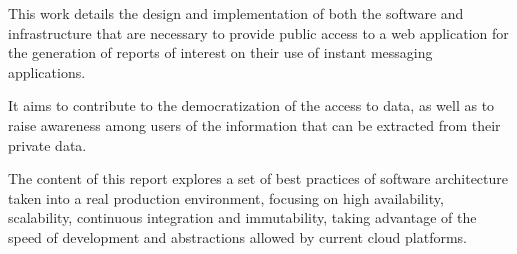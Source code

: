 
This work details the design and implementation of both the software and infrastructure that are necessary to provide public access to a web application for the generation of reports of interest on their use of instant messaging applications.

It aims to contribute to the democratization of the access to data, as well as to raise awareness among users of the information that can be extracted from their private data.

The content of this report explores a set of best practices of software architecture taken into a real production environment, focusing on high availability, scalability, continuous integration and immutability, taking advantage of the speed of development and abstractions allowed by current cloud platforms.

